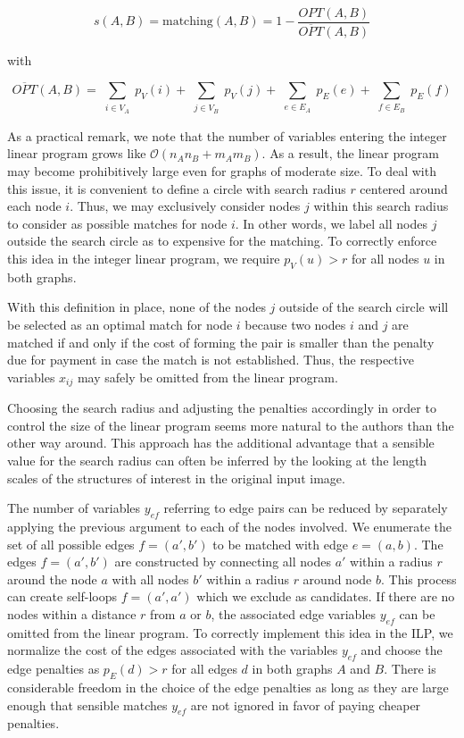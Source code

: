 		\begin{equation}
		s(A,B) = \text{matching}(A,B) = 1 - \frac{OPT(A,B)}{\overline{OPT}(A,B)}
		\end{equation}

		with

		\begin{equation}
		\overline{OPT}(A,B) =   \sum_{ \substack{i \in V_A }} p_{V}(i) + \sum_{ \substack{j \in V_B}} p_{V}(j)  + \sum_{ \substack{e \in E_A }} p_{E}(e) + \sum_{ \substack{f \in E_B}} p_{E}(f)
		\end{equation}


		As a practical remark, we note that the number of variables entering the integer linear program grows like $\mathcal{O}(n_A n_B + m_A m_B)$. As a result, the linear program may become prohibitively large even for graphs of moderate size. To deal with this issue, it is convenient to define a circle with search radius $r$ centered around each node $i$. Thus, we may exclusively consider nodes $j$ within this search radius to consider as possible matches for node $i$. In other words, we label all nodes $j$ outside the search circle as to expensive for the matching. To correctly enforce this idea in the integer linear program, we require $p_V(u) > r$ for all nodes $u$ in both graphs. 

		With this definition in place, none of the nodes $j$ outside of the search circle will be selected as an optimal match for node $i$ because two nodes $i$ and $j$ are matched if and only if the cost of forming the pair is smaller than the penalty due for payment in case the match is not established. Thus, the respective variables $x_{ij}$ may safely be omitted from the linear program. 

		Choosing the search radius and adjusting the penalties accordingly in order to control the size of the linear program seems more natural to the authors than the other way around. This approach has the additional advantage that a sensible value for the search radius can often be inferred by the looking at the length scales of the structures of interest in the original input image.

		The number of variables $y_{ef}$ referring to edge pairs can be reduced by separately applying the previous argument to each of the nodes involved. We enumerate the set of all possible edges $f = (a',b')$ to be matched with edge $e = (a,b)$. The edges $f = (a',b')$ are constructed by connecting all nodes $a'$ within a radius $r$ around the node $a$ with all nodes $b'$ within a radius $r$ around node $b$. This process can create self-loops $f =(a',a')$ which we exclude as candidates. If there are no nodes within a distance $r$ from $a$ or $b$, the associated edge variables $y_{ef}$ can be omitted from the linear program. To correctly implement this idea in the ILP, we normalize the cost of the edges associated with the variables $y_{ef}$ and choose the edge penalties as $p_E(d) > r $ for all edges $d$ in both graphs $A$ and $B$. There is considerable freedom in the choice of the edge penalties as long as they are large enough that sensible matches $y_{ef}$ are not ignored in favor of paying cheaper penalties. 

